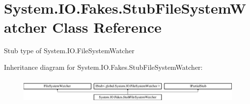 \hypertarget{class_system_1_1_i_o_1_1_fakes_1_1_stub_file_system_watcher}{\section{System.\-I\-O.\-Fakes.\-Stub\-File\-System\-Watcher Class Reference}
\label{class_system_1_1_i_o_1_1_fakes_1_1_stub_file_system_watcher}
}


Stub type of System.\-I\-O.\-File\-System\-Watcher 


Inheritance diagram for System.\-I\-O.\-Fakes.\-Stub\-File\-System\-Watcher\-:\begin{figure}[H]
\begin{center}
\leavevmode
\includegraphics[height=1.338112cm]{class_system_1_1_i_o_1_1_fakes_1_1_stub_file_system_watcher}
\end{center}
\end{figure}

